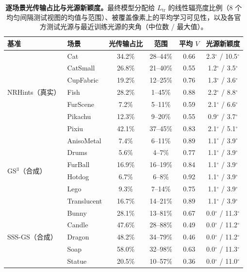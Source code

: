 \begin{table}[t]
\caption{\textbf{逐场景光传输占比与光源新颖度。}最终模型分配给 $L_{\mathrm{tr}}$ 的线性辐亮度比例（8 个均匀间隔测试视图的均值与范围）、被覆盖像素上的平均学习可见性，以及各官方测试光源与最近训练光源的夹角（中位数 / 最大值）。}
\label{tab:supp_shares}
\centering\scriptsize
\setlength{\tabcolsep}{3pt}
\begin{tabular}{@{}llcccc@{}}
\toprule
基准 & 场景 & 光传输占比 & 范围 & 平均 $V$ & 光源新颖度 \\
\midrule
\multirow{7}{*}{NRHints（真实）} & Cat & 34.2\% & 28--44\% & 0.66 & 2.3$^\circ$ / 10.5$^\circ$ \\
 & CatSmall & 26.8\% & 21--40\% & 0.55 & 1.2$^\circ$ / 3.5$^\circ$ \\
 & CupFabric & 19.2\% & 12--25\% & 0.76 & 1.3$^\circ$ / 3.6$^\circ$ \\
 & Fish & 28.2\% & 1--45\% & 0.88 & 2.2$^\circ$ / 8.8$^\circ$ \\
 & FurScene & 7.2\% & 5--11\% & 0.59 & 2.1$^\circ$ / 6.6$^\circ$ \\
 & Pikachu & 12.3\% & 9--20\% & 0.55 & 0.9$^\circ$ / 3.7$^\circ$ \\
 & Pixiu & 42.1\% & 37--45\% & 0.83 & 2.1$^\circ$ / 5.1$^\circ$ \\
\midrule
\multirow{6}{*}{GS$^3$（合成）} & AnisoMetal & 7.4\% & 6--11\% & 0.89 & 1.1$^\circ$ / 3.9$^\circ$ \\
 & Drums & 5.6\% & 4--7\% & 0.77 & 1.1$^\circ$ / 3.9$^\circ$ \\
 & FurBall & 16.9\% & 16--19\% & 0.84 & 1.1$^\circ$ / 3.9$^\circ$ \\
 & Hotdog & 6.7\% & 6--8\% & 0.92 & 1.1$^\circ$ / 3.9$^\circ$ \\
 & Lego & 9.3\% & 7--14\% & 0.75 & 1.1$^\circ$ / 3.9$^\circ$ \\
 & Translucent & 16.7\% & 14--21\% & 0.89 & 1.1$^\circ$ / 3.9$^\circ$ \\
\midrule
\multirow{5}{*}{SSS-GS（合成）} & Bunny & 28.1\% & 13--81\% & 0.67 & 0.0$^\circ$ / 11.3$^\circ$ \\
 & Candle & 47.6\% & 28--88\% & 0.49 & 0.0$^\circ$ / 11.2$^\circ$ \\
 & Dragon & 48.2\% & 34--79\% & 0.46 & 0.0$^\circ$ / 11.2$^\circ$ \\
 & Soap & 58.0\% & 32--98\% & 0.63 & 0.0$^\circ$ / 11.3$^\circ$ \\
 & Statue & 20.5\% & 10--57\% & 0.36 & 0.0$^\circ$ / 11.0$^\circ$ \\
\bottomrule
\end{tabular}
\end{table}

